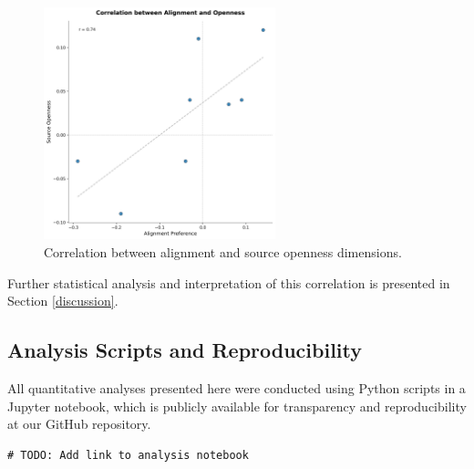 \begin{figure}[htbp]
    \centering
    \includegraphics[width=0.6\textwidth]{figures/alignment_openness_correlation.png}
    \caption{Correlation between alignment and source openness dimensions.}
    \label{fig:correlation}
\end{figure}

Further statistical analysis and interpretation of this correlation is presented in Section \ref{discussion}.

\subsection{Analysis Scripts and Reproducibility}
All quantitative analyses presented here were conducted using Python scripts in a Jupyter notebook, which is publicly available for transparency and reproducibility at our GitHub repository.

\begin{verbatim}
# TODO: Add link to analysis notebook
\end{verbatim}